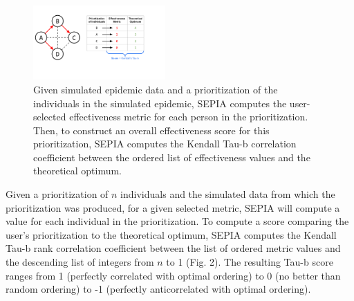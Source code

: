 \documentclass[twocolumn]{bmcart}%
\begin{document}

\begin{figure}[!h]
\centering
\includegraphics[width=0.45\textwidth]{Fig2.pdf}
\caption{Given simulated epidemic data and a prioritization of the individuals in the simulated epidemic, SEPIA computes the user-selected effectiveness metric for each person in the prioritization. Then, to construct an overall effectiveness score for this prioritization, SEPIA computes the Kendall Tau-b correlation coefficient between the ordered list of effectiveness values and the theoretical optimum.}
\end{figure}

Given a prioritization of $n$ individuals and the simulated data from which the prioritization was produced, for a given selected metric, SEPIA will compute a value for each individual in the prioritization.
To compute a score comparing the user's prioritization to the theoretical optimum,
SEPIA computes the Kendall Tau-b rank correlation coefficient \cite{kendall1938new}
between the list of ordered metric values and the descending list of integers from $n$ to 1 (Fig. 2). The resulting Tau-b score ranges from 1 (perfectly correlated with optimal ordering) to 0 (no better than random ordering) to -1 (perfectly anticorrelated with optimal ordering).
\end{document}
